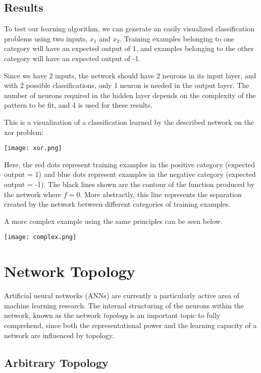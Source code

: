 \documentclass[a4paper, 11pt]{article} %
\begin{document}
\subsection*{Results}

To test our learning algorithm, we can generate an easily visualized classification problems using two inputs, $x_1$ and $x_2$.  Training examples belonging to one category will have an expected output of 1, and examples belonging to the other category will have an expected output of -1.

Since we have 2 inputs, the network should have 2 neurons in its input layer, and with 2 possible classifications, only 1 neuron is needed in the output layer.  The number of neurons required in the hidden layer depends on the complexity of the pattern to be fit, and 4 is used for these results.

This is a visualization of a classification learned by the described network on the xor problem:

\texttt{[image: xor.png]}

Here, the red dots represent training examples in the positive category (expected output = 1) and blue dots represent examples in the negative category (expected output = -1).  The black lines shown are the contour of the function produced by the network where $f = 0$.  More abstractly, this line represents the separation created by the network between different categories of training examples.

A more complex example using the same principles can be seen below.

\texttt{[image: complex.png]}

\section*{Network Topology}

Artificial neural networks (ANNs) are currently a particularly active area of machine learning research.  The internal structuring of the neurons within the network, known as the network \textit{topology} is an important topic to fully comprehend, since both the representational power and the learning capacity of a network are influenced by topology.

\subsection*{Arbitrary Topology}
\end{document}
